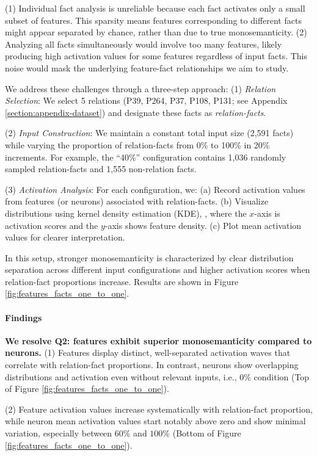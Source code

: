 (1) Individual fact analysis is unreliable because each fact activates only a small subset of features. This sparsity means features corresponding to different facts might appear separated by chance, rather than due to true monosemanticity.
(2)  Analyzing all facts simultaneously would involve too many features, likely producing high activation values for some features regardless of input facts. This noise would mask the underlying feature-fact relationships we aim to study.

We address these challenges through a three-step approach:
(1) \textit{Relation Selection}: We select 5 relations (P39, P264, P37, P108, P131; see Appendix \ref{section:appendix-dataset}) and designate these facts as \textit{relation-facts}.

(2) \textit{Input Construction}: We maintain a constant total input size (2,591 facts) while varying the proportion of relation-facts from 0\% to 100\% in 20\% increments. For example, the ``40\%'' configuration contains 1,036 randomly sampled relation-facts and 1,555 non-relation facts.

(3) \textit{Activation Analysis}:
For each configuration, we:
(a) Record activation values from features (or neurons) associated with relation-facts.
(b) Visualize distributions using kernel density estimation (KDE), , where the $x$-axis is activation scores and the $y$-axis shows feature density.
(c) Plot mean activation values for clearer interpretation.


In this setup, stronger monosemanticity is characterized by clear distribution separation across different input configurations and higher activation scores when relation-fact proportions increase. Results are shown in Figure \ref{fig:features_facts_one_to_one}.


\paragraph{Findings}
\textbf{We resolve Q2: features exhibit superior monosemanticity compared to neurons.} 
(1) Features display distinct, well-separated activation waves that correlate with relation-fact proportions. In contrast, neurons show overlapping distributions and activation even without relevant inputs, i.e., $0\%$ condition (Top of Figure \ref{fig:features_facts_one_to_one}).

(2) Feature activation values increase systematically with relation-fact proportion, while neuron mean activation values start notably above zero and show minimal variation, especially between $60\%$ and $100\%$ (Bottom of Figure \ref{fig:features_facts_one_to_one}).

